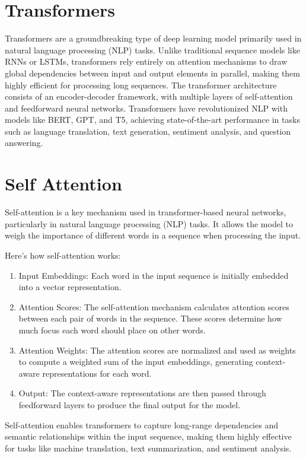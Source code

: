 \documentclass{article}
\begin{document}
\section{\Huge Transformers}
Transformers are a groundbreaking type of deep learning model primarily used in natural language processing (NLP) tasks. Unlike traditional sequence models like RNNs or LSTMs, transformers rely entirely on attention mechanisms to draw global dependencies between input and output elements in parallel, making them highly efficient for processing long sequences. The transformer architecture consists of an encoder-decoder framework, with multiple layers of self-attention and feedforward neural networks. Transformers have revolutionized NLP with models like BERT, GPT, and T5, achieving state-of-the-art performance in tasks such as language translation, text generation, sentiment analysis, and question answering.

\section{\Huge Self Attention}
Self-attention is a key mechanism used in transformer-based neural networks, particularly in natural language processing (NLP) tasks. It allows the model to weigh the importance of different words in a sequence when processing the input.

Here's how self-attention works:
\begin{enumerate}
\item Input Embeddings: Each word in the input sequence is initially embedded into a vector representation.
\item Attention Scores: The self-attention mechanism calculates attention scores between each pair of words in the sequence. These scores determine how much focus each word should place on other words.
\item Attention Weights: The attention scores are normalized and used as weights to compute a weighted sum of the input embeddings, generating context-aware representations for each word.
\item Output: The context-aware representations are then passed through feedforward layers to produce the final output for the model.
\end{enumerate}
Self-attention enables transformers to capture long-range dependencies and semantic relationships within the input sequence, making them highly effective for tasks like machine translation, text summarization, and sentiment analysis.
\end{document}
